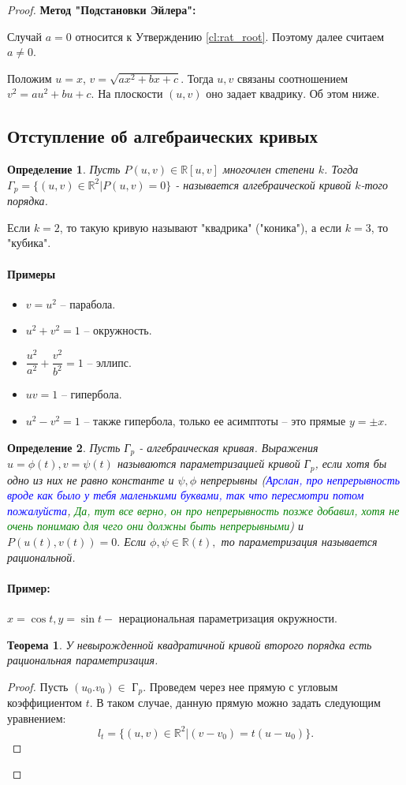 \documentclass{article}
\theoremstyle{plain}
\newtheorem{theorem}{Теорема}
\newtheorem{definition}{Определение}
\theoremstyle{definition}
\theoremstyle{remark}
\begin{document}
\begin{proof}
\textbf{Метод "Подстановки Эйлера":}

Случай $a=0$ относится к Утверждению \ref{cl:rat_root}. Поэтому далее считаем $a\neq 0$.

Положим $u=x$, $v=\sqrt{ax^2+bx+c}$. Тогда $u, v$ связаны соотношением $v^2 = au^2+bu+c$. На плоскости $(u, v)$ оно задает квадрику. Об этом ниже.

\subsection{Отступление об алгебраических кривых}
\begin{definition}
Пусть $P(u, v) \in \mathbb{R}[u, v]$ многочлен степени $k$. Тогда $\Gamma_p = \{ (u, v) \in \mathbb{R}^2 | P(u, v)=0 \}$ - называется алгебраической кривой $k$-того порядка.
\end{definition}
Если $k=2$, то такую кривую называют "квадрика" ("коника"), а если $k=3$, то "кубика".
\paragraph{Примеры}
\begin{itemize}
    \item $v = u^2$ -- парабола.
    \item $u^2 + v^2 = 1$ -- окружность.
    \item $\dfrac{u^2}{a^2} + \dfrac{v^2}{b^2} = 1$ -- эллипс.
    \item $uv = 1$ -- гипербола.
    \item $u^2 - v^2 = 1$ -- также гипербола, только ее асимптоты -- это прямые $y = \pm x.$
\end{itemize}
\begin{definition}
Пусть Г$_p$ - алгебраическая кривая. Выражения $u = \phi(t), v = \psi(t)$ называются параметризацией кривой Г$_p$, если хотя бы одно из них не равно константе и $\psi, \phi$ непрерывны (\textcolor{blue}{Арслан, про непрерывность вроде как было у тебя маленькими буквами, так что пересмотри потом пожалуйста}, \textcolor{green}{Да, тут все верно, он про непрерывность позже добавил, хотя не очень понимаю для чего они должны быть непрерывными}) и $P(u(t), v(t)) = 0.$ Если $\phi, \psi \in \mathbb{R}(t),$ то параметризация называется рациональной.
\end{definition}
\paragraph{Пример:}
$x = \cos{t}, y = \sin{t} - $ нерациональная параметризация окружности.
\begin{theorem}
У невырожденной квадратичной кривой второго порядка есть рациональная параметризация.
\end{theorem}
\begin{proof}
Пусть $(u_0. v_0) \in$ Г$_p.$ Проведем через нее прямую с угловым коэффициентом $t$. В таком случае, данную прямую можно задать следующим уравнением: \[l_t = \{(u, v) \in \mathbb{R}^2 | (v - v_0) = t(u - u_0)\}.\] 


\end{proof}
\end{proof}
\end{document}
